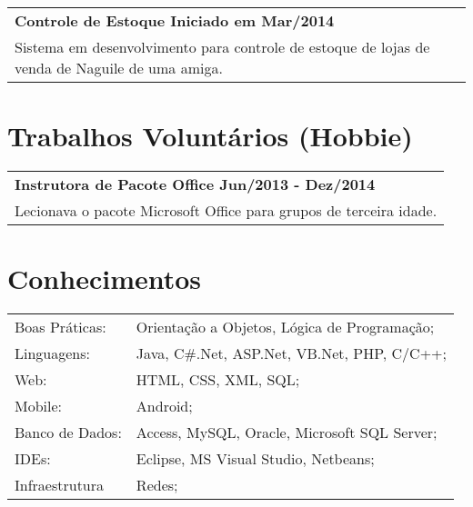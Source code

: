 \documentclass[a4paper, oneside, final]{scrartcl}
\newcommand{\vspc}{\vspace{0.15cm}} %
\begin{document}
\begin{center}
\begin{tabularx}{1\linewidth}{X}
{\bf Controle de Estoque \hfill Iniciado em Mar/2014} \\
Sistema em desenvolvimento para controle de estoque de lojas de venda de Naguile de uma amiga. \vspc\\
\end{tabularx}

\section{Trabalhos Voluntários (Hobbie)}
\begin{tabularx}{1\linewidth}{X}
{\bf Instrutora de Pacote Office \hfill Jun/2013 - Dez/2014} \\
Lecionava o pacote Microsoft Office para grupos de terceira idade. \vspc\\
\end{tabularx}


\section{Conhecimentos}
\begin{tabularx}{1\linewidth}{p{3.5cm}X}
Boas Práticas:   & Orientação a Objetos, Lógica de Programação;\\
Linguagens:      & Java, C\#.Net, ASP.Net, VB.Net, PHP, C/C++;\\
Web:             & HTML, CSS, XML, SQL;\\
Mobile:          & Android;\\
Banco de Dados:  & Access, MySQL, Oracle, Microsoft SQL Server; \\
IDEs:            & Eclipse, MS Visual Studio, Netbeans;\\
Infraestrutura   & Redes;
\end{tabularx}

\end{center}
\end{document}
